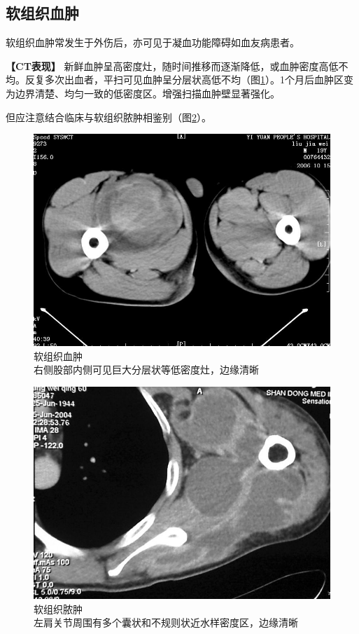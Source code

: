 \subsection{软组织血肿}

软组织血肿常发生于外伤后，亦可见于凝血功能障碍如血友病患者。

\textbf{【CT表现】}
新鲜血肿呈高密度灶，随时间推移而逐渐降低，或血肿密度高低不均。反复多次出血者，平扫可见血肿呈分层状高低不均（图\ref{fig22-28}）。1个月后血肿区变为边界清楚、均匀一致的低密度区。增强扫描血肿壁显著强化。

但应注意结合临床与软组织脓肿相鉴别（图\ref{fig22-29}）。

\begin{figure}[!htbp]
 \centering
 \includegraphics[width=.7\textwidth,height=\textheight,keepaspectratio]{./images/Image00453.jpg}
 \captionsetup{justification=centering}
 \caption{软组织血肿\\{\small 右侧股部内侧可见巨大分层状等低密度灶，边缘清晰}}
 \label{fig22-28}
  \end{figure} 

\begin{figure}[!htbp]
 \centering
 \includegraphics[width=.7\textwidth,height=\textheight,keepaspectratio]{./images/Image00454.jpg}
 \captionsetup{justification=centering}
 \caption{软组织脓肿\\{\small 左肩关节周围有多个囊状和不规则状近水样密度区，边缘清晰}}
 \label{fig22-29}
  \end{figure} 

